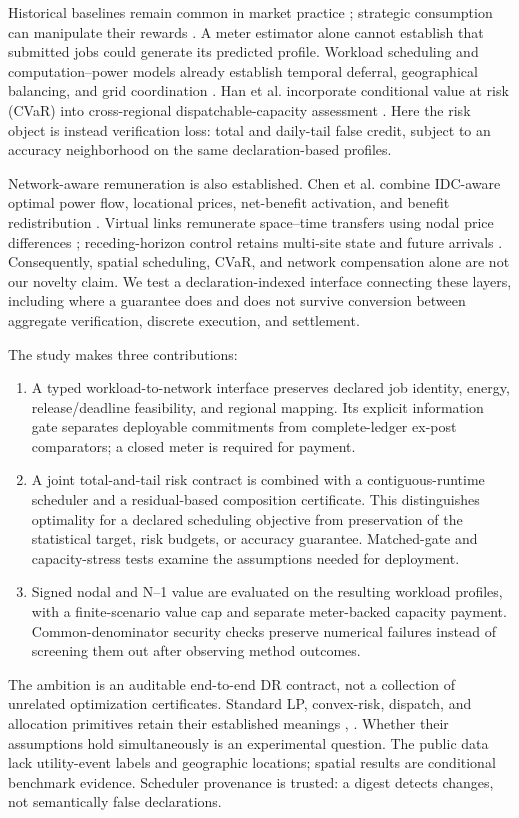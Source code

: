 \documentclass[10pt,journal]{IEEEtran}
\begin{document}
Historical baselines remain common in market practice
\cite{caiso2017baseline}; strategic consumption can manipulate their rewards
\cite{wang2022baseline}. A meter estimator alone cannot establish that
submitted jobs could generate its predicted profile. Workload scheduling and
computation--power models already establish temporal deferral, geographical
balancing, and grid coordination \cite{cao2022flexibility,li2024computation}.
Han et al. incorporate conditional value at risk (CVaR) into cross-regional
dispatchable-capacity assessment \cite{han2026dispatchable}. Here the risk
object is instead verification loss: total and daily-tail false credit,
subject to an accuracy neighborhood on the same declaration-based profiles.

Network-aware remuneration is also established. Chen et al. combine
IDC-aware optimal power flow, locational prices, net-benefit activation, and
benefit redistribution \cite{chen2021incentive}. Virtual links remunerate
space--time transfers using nodal price differences
\cite{zhang2020virtuallinks,zhang2022remunerating}; receding-horizon control
retains multi-site state and future arrivals \cite{zhang2023receding}.
Consequently, spatial scheduling, CVaR, and network compensation alone are not
our novelty claim. We test a declaration-indexed interface connecting these
layers, including where a guarantee does and does not survive conversion
between aggregate verification, discrete execution, and settlement.

The study makes three contributions:
\begin{enumerate}
\item A typed workload-to-network interface preserves declared job identity,
energy, release/deadline feasibility, and regional mapping. Its explicit
information gate separates deployable commitments from complete-ledger
ex-post comparators; a closed meter is required for payment.
\item A joint total-and-tail risk contract is combined with a contiguous-runtime
scheduler and a residual-based composition certificate. This distinguishes
optimality for a declared scheduling objective from preservation of the
statistical target, risk budgets, or accuracy guarantee. Matched-gate and
capacity-stress tests examine the assumptions needed for deployment.
\item Signed nodal and N--1 value are evaluated on the resulting workload
profiles, with a finite-scenario value cap and separate meter-backed capacity
payment. Common-denominator security checks preserve numerical failures
instead of screening them out after observing method outcomes.
\end{enumerate}
The ambition is an auditable end-to-end DR contract, not a collection of
unrelated optimization certificates. Standard LP, convex-risk, dispatch, and
allocation primitives retain their established meanings
\cite{boyd2004convex,rockafellar2000cvar}, \cite{shapley1953value}. Whether their
assumptions hold simultaneously is an experimental question. The public data
lack utility-event labels and geographic locations; spatial results are
conditional benchmark evidence. Scheduler provenance is trusted: a digest
detects changes, not semantically false declarations.
\end{document}
